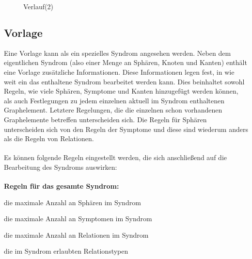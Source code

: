 \documentclass[enabledeprecatedfontcommands,fontsize=11pt,paper=a4,twoside]{scrartcl}
\newcommand*{\bbe}{\textcolor{bbe}}
\newcounter{one}
\let\origenumerate\enumerate
\let\origendenumerate\endenumerate
\renewenvironment{enumerate}{\origenumerate \addtolength{\itemsep}{-10.0pt}}{\origendenumerate}
\begin{document}
	\begin{figure}[ht!]
		\centering
		\caption{Verlauf(2)}
	
	\end{figure}
		

\clearpage
\subsection{Vorlage} \label{template}
Eine Vorlage kann als ein spezielles Syndrom angesehen werden. Neben dem eigentlichen Syndrom (also einer Menge an Sphären, Knoten und Kanten) enthält eine Vorlage zusätzliche Informationen. Diese Informationen legen fest, in wie weit ein das enthaltene Syndrom bearbeitet werden kann. Dies beinhaltet sowohl Regeln, wie viele Sphären, Symptome und Kanten hinzugefügt werden können, als auch Festlegungen zu jedem einzelnen aktuell im Syndrom enthaltenen Graphelement. Letztere Regelungen, die die einzelnen schon vorhandenen Graphelemente betreffen unterscheiden sich. Die Regeln für Sphären unterscheiden sich von den Regeln der Symptome und diese sind wiederum anders als die Regeln von Relationen. \\ \\
Es können folgende Regeln eingestellt werden, die sich anschließend auf die Bearbeitung des Syndroms auswirken: \\ \\
\textbf{\bbe{Regeln für das gesamte Syndrom:}}
\begin{enumerate}
	\item die maximale Anzahl an Sphären im Syndrom
	\item die maximale Anzahl an Symptomen im Syndrom 
	\item die maximale Anzahl an Relationen im Syndrom
	\item die im Syndrom erlaubten Relationstypen
\end{enumerate}
\end{document}
